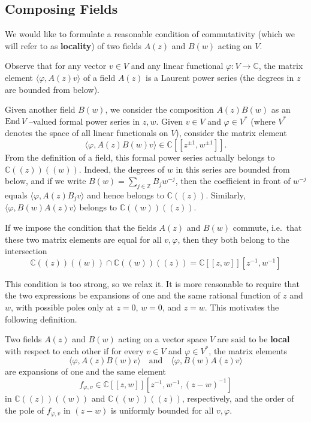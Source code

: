 \documentclass[12pt]{article}
\begin{document}
\subsection{Composing Fields}

We would like to formulate a reasonable condition of commutativity (which we will refer to as \textbf{locality}) of two fields $A(z)$ and $B(w)$ acting on $V$.

Observe that for any vector $v \in V$ and any linear functional $\varphi : V \to \mathbb{C}$, the matrix element $\langle \varphi, A(z)v \rangle$ of a field $A(z)$ is a Laurent power series (the degrees in $z$ are bounded from below).

Given another field $B(w)$, we consider the composition $A(z)B(w)$ as an $\operatorname{End} V$–valued formal power series in $z,w$.  
Given $v \in V$ and $\varphi \in V^*$ (where $V^*$ denotes the space of all linear functionals on $V$), consider the matrix element
\[
\langle \varphi, A(z)B(w)v \rangle \in \mathbb{C}[[z^{\pm1}, w^{\pm1}]].
\]
From the definition of a field, this formal power series actually belongs to $\mathbb{C}((z))((w))$.
Indeed, the degrees of $w$ in this series are bounded from below, and if we write $B(w) = \sum_{j \in \mathbb{Z}} B_j w^{-j}$, then the coefficient in front of $w^{-j}$ equals $\langle \varphi, A(z)B_j v\rangle$ and hence belongs to $\mathbb{C}((z))$.
Similarly, $\langle \varphi, B(w)A(z)v\rangle$ belongs to $\mathbb{C}((w))((z))$.

If we impose the condition that the fields $A(z)$ and $B(w)$ commute, i.e.\ that these two matrix elements are equal for all $v,\varphi$, then they both belong to the intersection \[\mathbb{C}((z))((w)) \cap \mathbb{C}((w))((z)) = \mathbb{C}[[z,w]][z^{-1},w^{-1}]\]

This condition is too strong, so we relax it.  
It is more reasonable to require that the two expressions be expansions of one and the same rational function of $z$ and $w$, with possible poles only at $z=0$, $w=0$, and $z=w$.  
This motivates the following definition.

\begin{definition}
Two fields $A(z)$ and $B(w)$ acting on a vector space $V$ are said to be \textbf{local} with respect to each other if for every $v \in V$ and $\varphi \in V^*$, the matrix elements
\[
\langle \varphi, A(z)B(w)v \rangle \quad \text{and} \quad \langle \varphi, B(w)A(z)v \rangle
\]
are expansions of one and the same element
\[
f_{\varphi,v} \in \mathbb{C}[[z,w]][z^{-1},w^{-1},(z-w)^{-1}]
\]
in $\mathbb{C}((z))((w))$ and $\mathbb{C}((w))((z))$, respectively, and the order of the pole of $f_{\varphi,v}$ in $(z-w)$ is uniformly bounded for all $v,\varphi$.
\end{definition}
\end{document}
